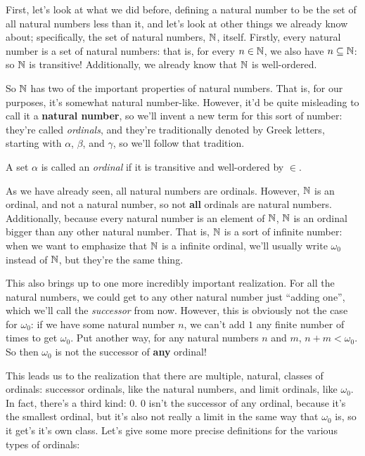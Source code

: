 First, let's look at what we did before, defining a natural number to be the set of all natural numbers less than it, and let's look at other things we already know about; specifically, the set of natural numbers, $\mathbb{N}$, itself.
Firstly, every natural number is a set of natural numbers: that is, for every $n \in \mathbb{N}$, we also have $n \subseteq \mathbb{N}$: so $\mathbb{N}$ is transitive!
Additionally, we already know that $\mathbb{N}$ is well-ordered. 

So $\mathbb{N}$ has two of the important properties of natural numbers.
That is, for our purposes, it's somewhat natural number-like.
However, it'd be quite misleading to call it a \textbf{natural number}, so we'll invent a new term for this sort of number: they're called \emph{ordinals}, and they're traditionally denoted by Greek letters, starting with $\alpha$, $\beta$, and $\gamma$, so we'll follow that tradition.

\begin{definition}
    A set $\alpha$ is called an \emph{ordinal} if it is transitive and well-ordered by $\in$.
\end{definition}

As we have already seen, all natural numbers are ordinals.
However, $\mathbb{N}$ is an ordinal, and not a natural number, so not \textbf{all} ordinals are natural numbers.
Additionally, because every natural number is an element of $\mathbb{N}$, $\mathbb{N}$ is an ordinal bigger than any other natural number.
That is, $\mathbb{N}$ is a sort of infinite number: when we want to emphasize that $\mathbb{N}$ is a infinite ordinal, we'll usually write $\omega_0$ instead of $\mathbb{N}$, but they're the same thing.

This also brings up to one more incredibly important realization.
For all the natural numbers, we could get to any other natural number just ``adding one'', which we'll call the \emph{successor} from now.
However, this is obviously not the case for $\omega_0$: if we have some natural number $n$, we can't add $1$ any finite number of times to get $\omega_0$.
Put another way, for any natural numbers $n$ and $m$, $n + m < \omega_0$.
So then $\omega_0$ is not the successor of \textbf{any} ordinal!

This leads us to the realization that there are multiple, natural, classes of ordinals: successor ordinals, like the natural numbers, and limit ordinals, like $\omega_0$.
In fact, there's a third kind: $0$.
$0$ isn't the successor of any ordinal, because it's the smallest ordinal, but it's also not really a limit in the same way that $\omega_0$ is, so it get's it's own class.
Let's give some more precise definitions for the various types of ordinals:

